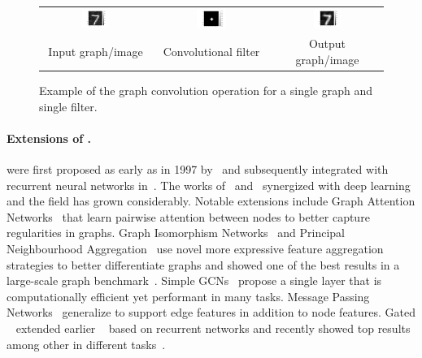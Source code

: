 \begin{figure}[htbp]
\begin{tabular}{ccc}
        \includegraphics[width=0.27\textwidth]{figs/graph_conv_in_im.pdf} &  
        \includegraphics[width=0.27\textwidth]{figs/graph_conv_kernel_im.pdf}
        &
        \includegraphics[width=0.27\textwidth]{figs/graph_conv_out_im.pdf} \\
        Input graph/image & Convolutional filter & Output graph/image \\
    \end{tabular}
    \caption{Example of the graph convolution operation for a single graph and single filter.}
    \label{fig:graph_conv}
\end{figure}


\vspace{-3pt}
\paragraph{Extensions of \gnns.}
\gnns were first proposed as early as in 1997 by~\citet{sperduti1997supervised} and subsequently integrated with recurrent neural networks in~\citep{gori2005new,scarselli2008graph}.
The works of~\citet{defferrard2016convolutional} and~\citet{kipf2016semi} synergized with deep learning and the \gnns field has grown considerably.
Notable extensions include Graph Attention Networks~\citep{velickovic2017graph} that learn pairwise attention between nodes to better capture regularities in graphs. Graph Isomorphism Networks~\citep{xu2018how} and Principal Neighbourhood Aggregation~\citep{corso2020principal} use novel more expressive feature aggregation strategies to better differentiate graphs and showed one of the best results in a large-scale graph benchmark~\citep{hu2020open}. Simple GCNs~\citep{wu2019simplifying} propose a single layer \gnn that is computationally efficient yet performant in many tasks. 
Message Passing Networks~\citep{gilmer2017neural,battaglia2018relational} generalize \gnns to support edge features in addition to node features. 
Gated \gnns~\citep{li2015gated} extended earlier \gnns~\citep{gori2005new,scarselli2008graph} based on recurrent networks and recently showed top results among other \gnns in different tasks~\citep{dwivedi2020benchmarking}.

